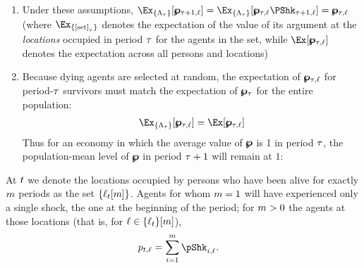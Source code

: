 \documentclass[../BufferStockTheory.tex]{subfiles}\usepackage{ApndxSteadyState}
\begin{document}
\begin{enumerate}
  \item Under these assumptions, $\Ex_{\{\Liv_{\tAbs}\}}[\pLev_{\tAbs+1,\posn}]=\Ex_{\{\Liv_{\tAbs}\}}[\pLev_{\tAbs,\posn}\PShk_{\tAbs+1,\posn}]=\pLev_{\tAbs,\posn}$ (where $\Ex_{\{\text{[set]}_{\tAbs}\}}$ denotes the expectation of the value of its argument at the \emph{locations} occupied in period $\tAbs$ for the agents in the set, while  $\Ex[\pLev_{\tAbs,\posn}]$ denotes the expectation across all persons and locations)      
  \item Because dying agents are selected at random, the expectation of $\pLev_{\tAbs,\posn}$ for period-$\tAbs$ survivors must match the expectation of $\pLev_{\tAbs}$ for the entire population:
    \begin{equation}\begin{gathered}\begin{aligned}
      \Ex_{\{\Liv_{\tAbs}\}}[\pLev_{\tAbs,\posn}]=\Ex[\pLev_{\tAbs,\posn}] \label{eq:pLevLivIsOne}
    \end{aligned}\end{gathered}\end{equation}
    Thus for an economy in which the average value of $\pLev$ is 1 in period $\tAbs$, the population-mean level of $\pLev$ in period $\tAbs+1$ will remain at $1$:
  \end{enumerate}
  At ${\tp}\FutPer$ we denote the locations occupied by persons who have been alive for exactly $\LooPer$ periods as the set $\{\posn_{{\tp}\FutPer}[\LooPer]\}$. Agents for whom $\LooPer=1$ will have experienced only a single shock, the one at the beginning of the period; for $\LooPer>0$ the agents at those locations (that is, for $\posn \in \{\posn_{{\tp}\FutPer}\}[\LooPer]$),
  \begin{equation}\begin{gathered}\begin{aligned}
    \pLog_{{\tp}\FutPer,\posn}  & = \sum_{\NewPer=1}^{\LooPer}\pShk_{{\tp}\NewPer,\posn}.
  \end{aligned}\end{gathered}\end{equation}
\end{document}

